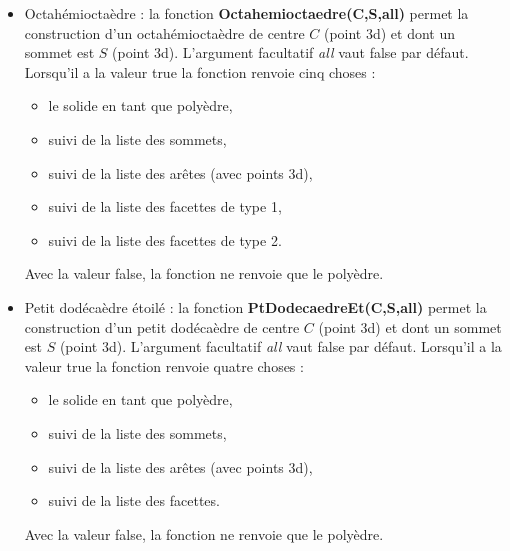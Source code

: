 \documentclass[%
10pt,%
a4paper,%
french,%
]%
{article}%
\begin{document}
\begin{itemize}
\item Octahémioctaèdre : la fonction \textbf{Octahemioctaedre(C,S,all)} permet la construction d'un octahémioctaèdre de centre $C$ (point 3d) et dont un sommet est $S$ (point 3d). L'argument facultatif \emph{all} vaut false par défaut. Lorsqu'il a la valeur true la fonction renvoie cinq choses :
    \begin{itemize}
        \item le solide en tant que polyèdre,
        \item suivi de la liste des sommets,
        \item suivi de la liste des arêtes (avec points 3d),
        \item suivi de la liste des facettes de type 1,
        \item suivi de la liste des facettes de type 2.
    \end{itemize}
Avec la valeur false, la fonction ne renvoie que le polyèdre.

\item Petit dodécaèdre étoilé : la fonction \textbf{PtDodecaedreEt(C,S,all)} permet la construction d'un petit dodécaèdre de centre $C$ (point 3d) et dont un sommet est $S$ (point 3d). L'argument facultatif \emph{all} vaut false par défaut. Lorsqu'il a la valeur true la fonction renvoie quatre choses :
    \begin{itemize}
        \item le solide en tant que polyèdre,
        \item suivi de la liste des sommets,
        \item suivi de la liste des arêtes (avec points 3d),
        \item suivi de la liste des facettes.
    \end{itemize}
Avec la valeur false, la fonction ne renvoie que le polyèdre.
\end{itemize}
\end{document}
